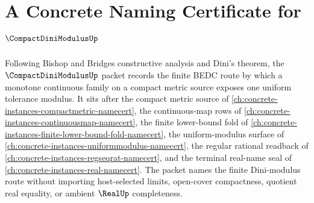 \chapter{A Concrete Naming Certificate for $\CompactDiniModulusUp$}
\label{ch:concrete-instances-compact-dini-modulus-namecert}

Following Bishop and Bridges constructive analysis and Dini's theorem, the $\CompactDiniModulusUp$ packet records the finite BEDC route by which a monotone continuous family on a compact metric source exposes one uniform tolerance modulus. It sits after the compact metric source of \autoref{ch:concrete-instances-compactmetric-namecert}, the continuous-map rows of \autoref{ch:concrete-instances-continuousmap-namecert}, the finite lower-bound fold of \autoref{ch:concrete-instances-finite-lower-bound-fold-namecert}, the uniform-modulus surface of \autoref{ch:concrete-instances-uniformmodulus-namecert}, the regular rational readback of \autoref{ch:concrete-instances-regseqrat-namecert}, and the terminal real-name seal of \autoref{ch:concrete-instances-real-namecert}. The packet names the finite Dini-modulus route without importing host-selected limits, open-cover compactness, quotient real equality, or ambient $\RealUp$ completeness.

